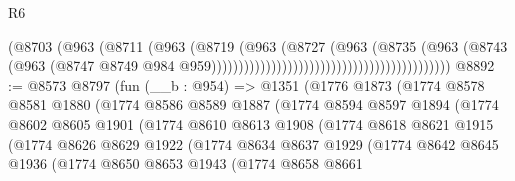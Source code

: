 \begin{lexlean}{R6}
\begin{coremodule}
                                                                  (@8703
                                                                    (@963
                                                                      (@8711
                                                                        (@963
                                                                          (@8719
                                                                            (@963
                                                                              (@8727
                                                                                (@963
                                                                                  (@8735
                                                                                    (@963
                                                                                      (@8743
                                                                                        (@963
                                                                                          (@8747
                                                                                            @8749
                                                                                            @984
                                                                                            @959))))))))))))))))))))))))))))))))))))))))))))
@8892 := @8573
    @8797
    (fun (__b : @954) =>
    @1351
      (@1776
        @1873
        (@1774
          @8578
          @8581
          @1880
          (@1774
            @8586
            @8589
            @1887
            (@1774
              @8594
              @8597
              @1894
              (@1774
                @8602
                @8605
                @1901
                (@1774
                  @8610
                  @8613
                  @1908
                  (@1774
                    @8618
                    @8621
                    @1915
                    (@1774
                      @8626
                      @8629
                      @1922
                      (@1774
                        @8634
                        @8637
                        @1929
                        (@1774
                          @8642
                          @8645
                          @1936
                          (@1774
                            @8650
                            @8653
                            @1943
                            (@1774
                              @8658
                              @8661

\end{coremodule}
\end{lexlean}

